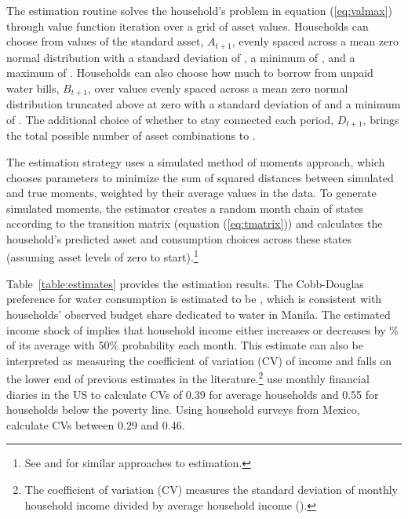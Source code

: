 \documentclass[12pt]{article}
\begin{document}
The estimation routine solves the household's problem in equation (\ref{eq:valmax}) through value function iteration over a grid of asset values.  Households can choose from values of the standard asset, $A_{t+1}$, evenly spaced across a mean zero normal distribution with a standard deviation of \unskip, a minimum of \unskip, and a maximum of \unskip.  Households can also choose how much to borrow from unpaid water bills, $B_{t+1}$, over values evenly spaced across a mean zero normal distribution truncated above at zero with a standard deviation of and a minimum of \unskip.  The additional choice of whether to stay connected each period, $D_{t+1}$, brings the total possible number of asset combinations to \unskip.  

The estimation strategy uses a simulated method of moments approach, which chooses parameters to minimize the sum of squared distances between simulated and true moments, weighted by their average values in the data.  To generate simulated moments, the estimator creates a random month chain of states according to the transition matrix (equation (\ref{eq:tmatrix})) and calculates the household's predicted asset and consumption choices across these states (assuming asset levels of zero to start).\footnote{See \cite{laibson2007estimating} and \cite{gourinchas2002consumption} for similar approaches to estimation.}

Table~\ref{table:estimates} provides the estimation results.  The Cobb-Douglas preference for water consumption is estimated to be \unskip, which is consistent with households' observed budget share dedicated to water in Manila.  The estimated income shock of implies that household income either increases or decreases by \unskip\% of its average with 50\% probability each month.  This estimate can also be interpreted as measuring the coefficient of variation (CV) of income and falls on the lower end of previous estimates in the literature.\footnote{The coefficient of variation (CV) measures the standard deviation of monthly household income divided by average household income (\cite{hannagan2015income}).}  \cite{hannagan2015income} use monthly financial diaries in the US to calculate CVs of 0.39 for average households and 0.55 for households below the poverty line.  Using household surveys from Mexico, \cite{amuedo2011remittances} calculate CVs between 0.29 and 0.46. %
\end{document}
